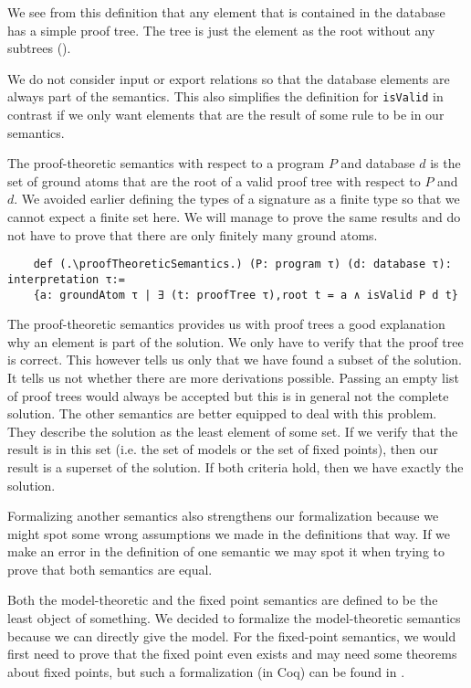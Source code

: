 We see from this definition that any element that is contained in the database has a simple proof tree. The tree is just the element as the root without any subtrees (\databaseElementsHaveValidProofTree). 

We do not consider input or export relations so that the database elements are always part of the semantics. This also simplifies the definition for \lstinline|isValid| in contrast if we only want elements that are the result of some rule to be in our semantics.

The proof-theoretic semantics with respect to a program $P$ and database $d$ is the set of ground atoms that are the root of a valid proof tree with respect to $P$ and $d$. We avoided earlier defining the types of a signature as a finite type so that we cannot expect a finite set here. We will manage to prove the same results and do not have to prove that there are only finitely many ground atoms.

\begin{lstlisting}
    def (.\proofTheoreticSemantics.) (P: program τ) (d: database τ): interpretation τ:= 
    {a: groundAtom τ | ∃ (t: proofTree τ),root t = a ∧ isValid P d t}
\end{lstlisting}

The proof-theoretic semantics provides us with proof trees a good explanation why an element is part of the solution. We only have to verify that the proof tree is correct. This however tells us only that we have found a subset of the solution. It tells us not whether there are more derivations possible. Passing an empty list of proof trees would always be accepted but this is in general not the complete solution. The other semantics are better equipped to deal with this problem. They describe the solution as the least element of some set. If we verify that the result is in this set (i.e. the set of models or the set of fixed points), then our result is a superset of the solution. If both criteria hold, then we have exactly the solution.

Formalizing another semantics also strengthens our formalization because we might spot some wrong assumptions we made in the definitions that way. If we make an error in the definition of one semantic we may spot it when trying to prove that both semantics are equal.

Both the model-theoretic and the fixed point semantics are defined to be the least object of something. We decided to formalize the model-theoretic semantics because we can directly give the model. For the fixed-point semantics, we would first need to prove that the fixed point even exists and may need some theorems about fixed points, but such a formalization (in Coq) can be found in \cite{datalogCoq}.

